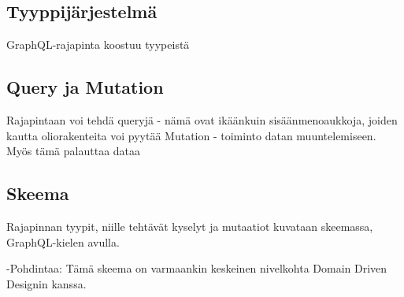 \hypertarget{tyyppijuxe4rjestelmuxe4}{%
\subsection{Tyyppijärjestelmä}\label{tyyppijuxe4rjestelmuxe4}}

GraphQL-rajapinta koostuu tyypeistä

\hypertarget{query-ja-mutation}{%
\subsection{Query ja Mutation}\label{query-ja-mutation}}

Rajapintaan voi tehdä queryjä - nämä ovat ikäänkuin sisäänmenoaukkoja,
joiden kautta oliorakenteita voi pyytää Mutation - toiminto datan
muuntelemiseen. Myös tämä palauttaa dataa

\hypertarget{skeema}{%
\subsection{Skeema}\label{skeema}}

Rajapinnan tyypit, niille tehtävät kyselyt ja mutaatiot kuvataan
skeemassa, GraphQL-kielen avulla.

-Pohdintaa: Tämä skeema on varmaankin keskeinen nivelkohta Domain Driven
Designin kanssa.
